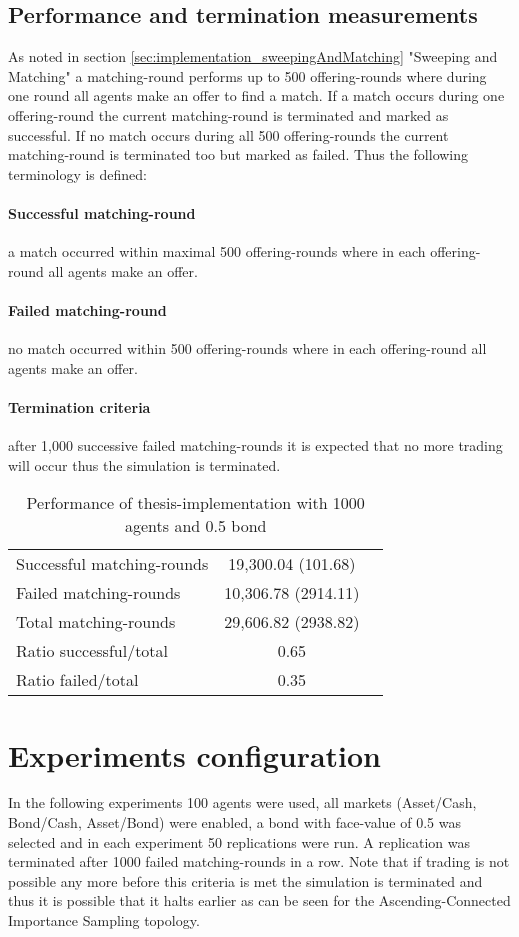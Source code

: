 \documentclass[Bachelorarbeit.tex]{subfiles}
\begin{document}
\subsection{Performance and termination measurements}
As noted in section \ref{sec:implementation_sweepingAndMatching} "Sweeping and Matching" a matching-round performs up to 500 offering-rounds where during one round all agents make an offer to find a match. If a match occurs during one offering-round the current matching-round is terminated and marked as successful. If no match occurs during all 500 offering-rounds the current matching-round is terminated too but marked as failed. Thus the following terminology is defined:

\paragraph{Successful matching-round} a match occurred within maximal 500 offering-rounds where in each offering-round all agents make an offer.
\paragraph{Failed matching-round} no match occurred within 500 offering-rounds where in each offering-round all agents make an offer.
\paragraph{Termination criteria} after 1,000 successive failed matching-rounds it is expected that no more trading will occur thus the simulation is terminated.

\begin{table}[H]
	\centering
	\caption{Performance of thesis-implementation with 1000 agents and 0.5 bond}
	\begin{tabular} { l c r }
		\hline
		Successful matching-rounds & 19,300.04 (101.68) \\
		Failed matching-rounds & 10,306.78 (2914.11) \\
		Total matching-rounds & 29,606.82 (2938.82) \\
		\hline
		Ratio successful/total & 0.65 \\
		Ratio failed/total & 0.35 \\
		\hline
	\end{tabular}
\end{table}


\section{Experiments configuration}
In the following experiments 100 agents were used, all markets (Asset/Cash, Bond/Cash, Asset/Bond) were enabled, a bond with face-value of 0.5 was selected and in each experiment 50 replications were run. A replication was terminated after 1000 failed matching-rounds in a row. Note that if trading is not possible any more before this criteria is met the simulation is terminated and thus it is possible that it halts earlier as can be seen for the Ascending-Connected Importance Sampling topology.
\end{document}

